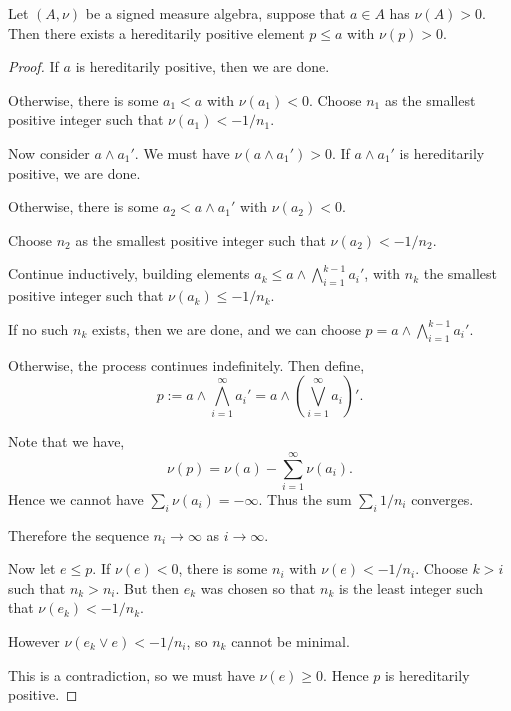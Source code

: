 \documentclass{owmaths}
\begin{document}
\begin{lemma}
\label{positiveImpliesContainsPositive}
Let $(A,\nu)$ be a signed measure algebra, suppose that $a \in A$ has $\nu(A) > 0$.
Then there exists a hereditarily positive element $p \leq a$ with $\nu(p) > 0$.
\end{lemma}
\begin{proof}
    If $a$ is hereditarily positive, then we are done.
    
    Otherwise, there is some $a_1 < a$ with $\nu(a_1) < 0$.
    Choose $n_1$ as the smallest positive integer such that $\nu(a_1) < -1/n_1$.
    
    Now consider $a \wedge a_1'$. We must have $\nu(a\wedge a_1') > 0$. 
    If $a \wedge a_1'$ is hereditarily positive, we are done. 
    
    Otherwise, there is some $a_2 < a \wedge a_1'$ with $\nu(a_2) < 0$.
    
    Choose $n_2$ as the smallest positive integer such that $\nu(a_2) < -1/n_2$.
    
    Continue inductively, building elements $a_k \leq a\wedge \bigwedge_{i=1}^{k-1} a_i'$,
    with $n_k$ the smallest positive integer such that $\nu(a_k) \leq -1/n_k$.
    
    If no such $n_k$ exists, then we are done, and we can choose $p = a \wedge \bigwedge_{i=1}^{k-1} a_i'$.
    
    Otherwise, the process continues indefinitely. Then define,
    \begin{equation*}
        p := a \wedge \bigwedge_{i=1}^\infty a_i' = a\wedge\left(\bigvee_{i=1}^\infty a_i\right)'.
    \end{equation*}
    
    Note that we have,
    \begin{equation*}
        \nu(p) = \nu(a) - \sum_{i=1}^\infty \nu(a_i).
    \end{equation*}
    Hence we cannot have $\sum_i \nu(a_i) = -\infty$. Thus
    the sum $\sum_i 1/n_i$ converges. 
    
    Therefore the sequence $n_i \rightarrow \infty$ as $i\rightarrow\infty$.
    
    Now let $e \leq p$. If $\nu(e) < 0$, there is some $n_i$
    with $\nu(e) < -1/n_i$. Choose $k > i$ such that $n_k > n_i$. But
    then $e_k$ was chosen so that $n_k$ is the least integer such that $\nu(e_k) < -1/n_k$.
    
    However $\nu(e_k \vee e) < -1/n_i$, so $n_k$ cannot be minimal.
    
    This is a contradiction, so we must have $\nu(e) \geq 0$. Hence $p$
    is hereditarily positive.
\end{proof}
\end{document}
